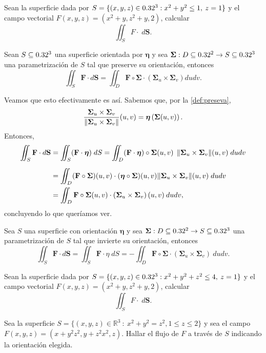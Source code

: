 \begin{tarea}  Sean  la superficie dada por $S=\{ (x,y,z) \in 0.32^3:  x^{2}+y^{2}  \leq 1, \:  z=1 \}$  y el campo vectorial $F(x,y,z) = (x^{2}+y, z^{2}+y, 2)$, calcular  $$   \iint_S F \cdot \;d\mathbf{S}. $$
\end{tarea} 


\begin{obs}   Sean $S\subseteq0.32^3$ una superficie orientada por $\boldsymbol{\eta}$ y  sea  $\boldsymbol{\Sigma}:D\subseteq0.32^2\to S\subseteq0.32^3$ una parametrizaci\'on de $S$ tal que preserve su orientaci\'on, entonces 
 $$ \iint_S \mathbf{F}\cdot d\mathbf{S} = \iint_D \mathbf{F}\circ\boldsymbol{\Sigma}\cdot\left(\boldsymbol{\Sigma}_u\times\boldsymbol{\Sigma}_v\right)dudv.$$
\end{obs}
Veamos que esto efectivamente es as\'i.  Sabemos que, por la \autoref{def:preseva},
\[
    \frac{\boldsymbol{\Sigma}_u\times\boldsymbol{\Sigma}_v}{\norm{\boldsymbol{\Sigma}_u\times\boldsymbol{\Sigma}_v}}(u,v)=\boldsymbol{\eta}\left(\boldsymbol{\Sigma}(u,v)\right).
\]
Entonces,
\begin{align*}
    \iint_S \mathbf{F}\cdot d\mathbf{S}&=\iint_S (\mathbf{F}\cdot\boldsymbol{\eta}) \;dS = \iint_D (\mathbf{F}\cdot\boldsymbol{\eta})\circ\boldsymbol{\Sigma}(u,v) \:\:\norm{\boldsymbol{\Sigma}_u\times\boldsymbol{\Sigma}_v}(u,v) \;dudv\\[.2cm]
    &=\iint_D (\mathbf{F}\circ\boldsymbol{\Sigma})(u,v) \cdot(\boldsymbol{\eta}\circ\boldsymbol{\Sigma})(u,v) \norm{\boldsymbol{\Sigma}_u\times\boldsymbol{\Sigma}_v}(u,v) \;dudv\\
    &=\iint_D \mathbf{F}\circ\boldsymbol{\Sigma}(u,v) \cdot\left(\boldsymbol{\Sigma}_u\times\boldsymbol{\Sigma}_v\right)(u,v) \: dudv,
\end{align*} concluyendo lo que quer\'iamos ver.

\begin{obs}
    Sea $S$ una superficie con orientaci\'on $\boldsymbol{\eta}$ y sea $\boldsymbol{\Sigma}:D\subseteq0.32^2\to S\subseteq0.32^3$ una parametrizaci\'on de $S$ tal que invierte su orientaci\'on, entonces
    \[
        \iint_S \mathbf{F}\cdot d\mathbf{S} = \iint_S \mathbf{F}\cdot\eta\;dS=-\iint_D \mathbf{F}\circ\boldsymbol{\Sigma}\cdot(\boldsymbol{\Sigma}_u\times\boldsymbol{\Sigma}_v)\:dudv.
    \]
\end{obs}


\begin{tarea}  Sean  la superficie dada por $S=\{ (x,y,z) \in 0.32^3:  x^{2}+y^{2} + z^{2} \leq 4, \:  z=1 \}$ y el campo vectorial $F(x,y,z) = (x^{2}+y, z^{2}+y, 2)$, calcular  $$   \iint_S F \cdot \;d\mathbf{S}. $$
\end{tarea} 

\begin{tarea}
 Sea la superficie   $S=\{  (x,y,z) \in \mathbb{R}^{3} \: : \: x ^{2}+ y^{2} = z^{2}, 1 \leq z \leq 2 \}$  y   sea el campo $F(x,y,z)=(x+y^{2}z^{2}, y+z^{2}x^{2}, z).$  Hallar el flujo  de $F$ a trav\'es de $S$ indicando la orientaci\'on elegida.
\end{tarea}  


